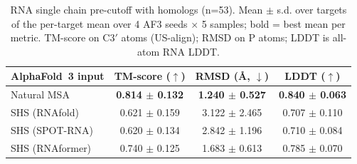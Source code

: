 \begin{table}[htbp]
\centering
\caption{RNA single chain pre-cutoff with homologs (n=53). Mean $\pm$ s.d. over targets of the per-target mean over 4 AF3 seeds $\times$ 5 samples; bold = best mean per metric. TM-score on C3$'$ atoms (US-align); RMSD on P atoms; LDDT is all-atom RNA LDDT.}
\label{tab:rna_single_chain_pre_cutoff_with_homologs}
\begin{tabular}{lccc}
\toprule
AlphaFold~3 input & TM-score ($\uparrow$) & RMSD (\AA, $\downarrow$) & LDDT ($\uparrow$) \\
\midrule
Natural MSA & \textbf{0.814 $\pm$ 0.132} & \textbf{1.240 $\pm$ 0.527} & \textbf{0.840 $\pm$ 0.063} \\
SHS (RNAfold) & 0.621 $\pm$ 0.159 & 3.122 $\pm$ 2.465 & 0.707 $\pm$ 0.110 \\
SHS (SPOT-RNA) & 0.620 $\pm$ 0.134 & 2.842 $\pm$ 1.196 & 0.710 $\pm$ 0.084 \\
SHS (RNAformer) & 0.740 $\pm$ 0.125 & 1.683 $\pm$ 0.613 & 0.785 $\pm$ 0.070 \\
\bottomrule
\end{tabular}
\end{table}
